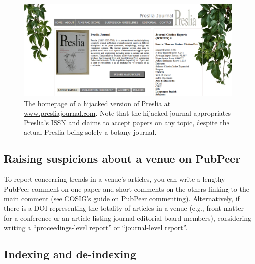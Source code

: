 \documentclass[letterpaper, 12pt]{article}
\begin{document}
\begin{figure}[h!tbp]
    \centering
    \includegraphics[width=\textwidth]{img/venues/Preslia hijacked-min.png}
    \caption*{The homepage of a hijacked version of Preslia at \href{https://presliajournal.com/}{www.presliajournal.com}. Note that the hijacked journal appropriates Preslia's ISSN and claims to accept papers on any topic, despite the actual Preslia being solely a botany journal.}
\end{figure}

\subsection*{Raising suspicions about a venue on PubPeer}

To report concerning trends in a venue's articles, you can write a lengthy PubPeer comment on one paper
and short comments on the others linking to the main comment (see \href{https://osf.io/sghaq}{COSIG's guide on PubPeer commenting}).
Alternatively, if there is a DOI representing the totality of articles in a venue (e.g., front matter for a conference or an article listing journal editorial board members), considering writing a \href{https://pubpeer.com/search?q=\%22proceedings-level+report\%22}{``proceedings-level report''} or \href{https://pubpeer.com/search?q=\%22journal-level+report\%22}{``journal-level report''}.

\subsection*{Indexing and de-indexing}
\end{document}
